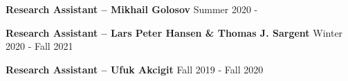 
\begin{cventries}
  \cventry
    {\textbf{Research Assistant – Mikhail Golosov}} %
    {} %
    {} %
    {Summer 2020 -} %
    {}
  
  \cventry
    {\textbf{Research Assistant – Lars Peter Hansen \& Thomas J. Sargent}} %
    {} %
    {} %
    {Winter 2020 - Fall 2021} %
    {}
  
  \cventry
    {\textbf{Research Assistant – Ufuk Akcigit}} %
    {} %
    {} %
    {Fall 2019 - Fall 2020} %
    {}

\end{cventries}

